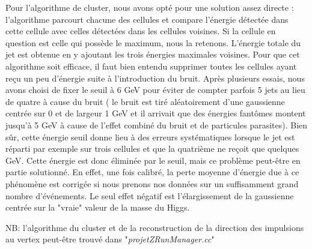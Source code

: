 \documentclass[11pt]{article}
\begin{document}
Pour l'algorithme de cluster, nous avons opté pour une solution assez directe :
l'algorithme parcourt chacune des cellules et compare l'énergie
détectée dans cette cellule avec celles détectées dans les cellules voisines.
Si la cellule en question est celle qui possède le maximum, nous la retenons.
L'énergie totale du jet est obtenue en y ajoutant les trois énergies
maximales voisines. Pour que cet algorithme soit efficace, il faut bien entendu
supprimer toutes les cellules ayant reçu un peu d'énergie suite à
l'introduction du bruit. Après
plusieurs essais, nous avons choisi de fixer le seuil à 6 GeV pour éviter de
compter parfois 5 jets au lieu de quatre à cause du bruit ( le bruit est tiré
aléatoirement d'une gaussienne centrée sur 0 et de largeur 1 GeV et il arrivait
que des énergies fantômes montent jusqu'à 5 GeV à cause de l'effet combiné du
bruit et de particules parasites). Bien sûr, cette énergie seuil
donne lieu à des erreurs systématiques lorsque le jet est réparti par exemple
sur trois cellules et que la quatrième ne reçoit que quelques GeV. Cette
énergie est donc éliminée par le seuil, mais ce problème peut-être en partie
solutionné. En effet, une fois calibré, la perte moyenne d'énergie due à ce
phénomène est corrigée si nous prenons nos données sur un suffisamment grand
nombre d'événements. Le seul effet négatif est l'élargissement de la gaussienne
centrée sur la "vraie" valeur de la masse du Higgs.

NB: l'algorithme du cluster et de la reconstruction de la direction des
impulsions au vertex peut-être trouvé dans "\textit{projetZRunManager.cc}"
\end{document}
